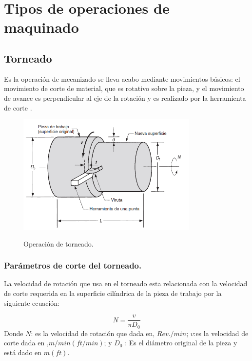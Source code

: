 \section*{Tipos de operaciones de maquinado }

\subsection*{Torneado}

Es la operación de mecanizado se lleva acabo mediante movimientos básicos: el movimiento de corte de material, que es rotativo sobre la pieza, y el movimiento de avance es perpendicular al eje de la rotación y es realizado por la herramienta de corte \citep{Fenoll2009}.\\

\begin{figure}[ht]
    \centering
    \includegraphics[width = 0.8\textwidth]{Cap1_FormulaciondelProyecto/torneado.PNG}
    \caption{Operación de torneado.}
    \citep{groover2007fundamentals}
\end{figure}
\subsubsection*{Parámetros de corte del torneado.}

La velocidad de rotación que usa en el torneado esta relacionada con la velocidad de corte requerida en la superficie cilíndrica de la pieza de trabajo por la siguiente ecuación: 

\begin{equation}
    N=\frac{v}{\pi D_{0}}
\end{equation}
Donde $N$: es la velocidad de rotación que dada en, $Rev./min$; $v$:es la velocidad de corte dada en ,$m/min (ft/min)$; y $D_{0}$ : Es el diámetro original de la pieza y está dado en $m(ft)$.

